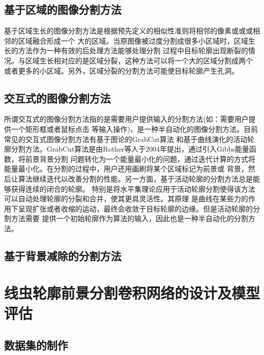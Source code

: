 \subsection{基于区域的图像分割方法}
	基于区域生长的图像分割方法是根据预先定义的相似性准则将相邻的像素或或或相邻的区域融合形成一个
	大的区域。当原图像被过度分割成很多小区域时，区域生长的方法作为一种有效的后处理方法能够处理分割
	过程中目标轮廓出现断裂的情况。与区域生长相对应的是区域分裂，这种方法可以将一个大的区域分割成两个
	或者更多的小区域。另外，区域分裂的分割方法可能使目标轮廓产生孔洞。
\subsection{交互式的图像分割方法}
	所谓交互式的图像分割方法指的是需要用户提供输入的分割方法(如：需要用户提供一个矩形框或者鼠标点击
	等输入操作)，是一种半自动化的图像分割方法。目前常见的交互式图像分割方法有基于图论的GrabCut算法\cite{rother2004grabcut}
	和基于曲线演化的活动轮廓分割方法。GrabCut算法是由Rother等人于2004年提出，通过引入Gibbs能量函数，将前景背景分割
	问题转化为一个能量最小化的问题，通过迭代计算的方式将能量最小化。在分割的过程中，用户还用画刷将某个区域标记为前景或
	背景，然后让算法继续迭代以改善分割的性能。另一方面，基于活动轮廓的分割方法总是能够获得连续的闭合的轮廓。
	特别是将水平集理论应用于活动轮廓分割使得该方法可以自动处理轮廓的分裂和合并，使其更具灵活性。其原理
	是曲线在某些力的作用下呈现扩张或者收缩的运动，最终会收敛于目标轮廓的边缘。但是活动轮廓的分割方法需要
	提供一个初始轮廓作为算法的输入，因此也是一种半自动化的分割方法。
\subsection{基于背景减除的分割方法}

\section{线虫轮廓前景分割卷积网络的设计及模型评估}

\subsection{数据集的制作}
